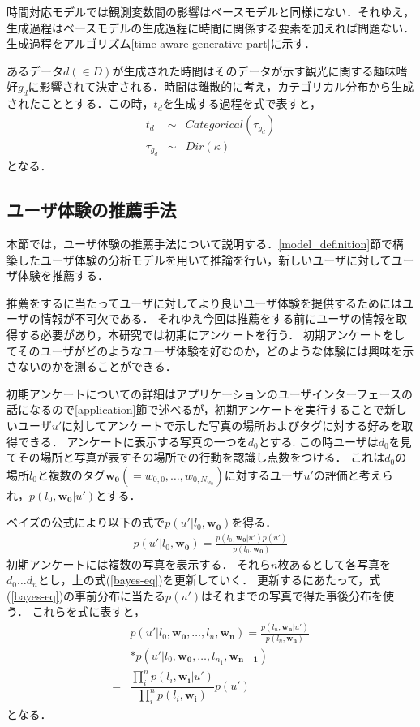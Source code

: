 \documentclass[a4j,10pt, twocolumn]{jarticle}
\begin{document}
%
時間対応モデルでは観測変数間の影響はベースモデルと同様にない．それゆえ，生成過程はベースモデルの生成過程に時間に関係する要素を加えれば問題ない．
生成過程をアルゴリズム\ref{time-aware-generative-part}に示す．

あるデータ$d(\in D)$が生成された時間はそのデータが示す観光に関する趣味嗜好$g_d$に影響されて決定される．時間は離散的に考え，カテゴリカル分布から生成されたこととする．この時，$t_d$を生成する過程を式で表すと，
\begin{eqnarray}
  t_d & \sim & Categorical(\tau_{g_d}) \\
  \tau_{g_d} & \sim & Dir(\kappa)
\end{eqnarray}
となる．

\subsection{ユーザ体験の推薦手法} \label{recommendation}
本節では，ユーザ体験の推薦手法について説明する．\ref{model_definition}節で構築したユーザ体験の分析モデルを用いて推論を行い，新しいユーザに対してユーザ体験を推薦する．

推薦をするに当たってユーザに対してより良いユーザ体験を提供するためにはユーザの情報が不可欠である．
それゆえ今回は推薦をする前にユーザの情報を取得する必要があり，本研究では初期にアンケートを行う．
初期アンケートをしてそのユーザがどのようなユーザ体験を好むのか，どのような体験には興味を示さないのかを測ることができる．

初期アンケートについての詳細はアプリケーションのユーザインターフェースの話になるので\ref{application}節で述べるが，初期アンケートを実行することで新しいユーザ$u'$に対してアンケートで示した写真の場所およびタグに対する好みを取得できる．
アンケートに表示する写真の一つを$d_0$とする.
この時ユーザは$d_0$を見てその場所と写真が表すその場所での行動を認識し点数をつける．
これは$d_0$の場所$l_0$と複数のタグ$\bm{w_0}(=w_{0,0}, \dots, w_{0,N_{w_0}})$に対するユーザ$u'$の評価と考えられ，$p(l_0,\bm{w_0}|u')$とする．

ベイズの公式により以下の式で$p(u'|l_0, \bm{w_0})$を得る．
\begin{eqnarray}
  \label{bayes-eq}
  p(u'|l_0, \bm{w_0}) = \frac{p(l_0, \bm{w_0}|u')p(u')}{p(l_0, \bm{w_0})}
\end{eqnarray}
初期アンケートには複数の写真を表示する．
それら$n$枚あるとして各写真を$d_0 \dots d_n$とし，上の式(\ref{bayes-eq})を更新していく．
更新するにあたって，式(\ref{bayes-eq})の事前分布に当たる$p(u')$はそれまでの写真で得た事後分布を使う．
これらを式に表すと，
\begin{align}
  &p(u'|l_0, \bm{w_0}, \dots , l_n, \bm{w_n}) = \frac{p(l_n, \bm{w_n}|u')}{p(l_n, \bm{w_n})} \nonumber \\
  &* p(u'|l_0, \bm{w_0}, \dots , l_{n_1}, \bm{w_{n-1}}) \\
  \label{bayes-update}
  =& \dfrac{\prod_i^n p(l_i, \bm{w_i}|u')}{\prod_i^n p(l_i, \bm{w_i})} p(u') 
\end{align}
となる．
\end{document}
